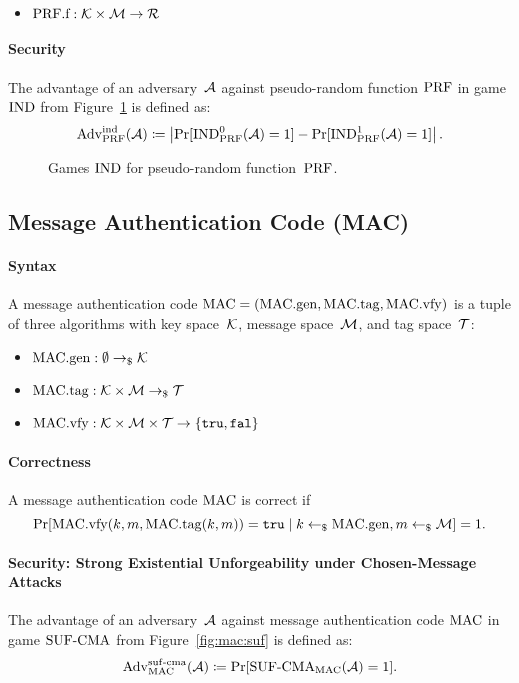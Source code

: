 \documentclass[a4paper,orivec]{llncs}
\begin{document}
\begin{itemize}
    \item $\mathrm{PRF}.\mathrm{f}: \mathcal{K}\times\mathcal{M} \to \mathcal{R}$
\end{itemize}

\paragraph{Security}
The advantage of an adversary~$\mathcal{A}$ against pseudo-random function $\mathrm{PRF}$ in game ${\mathrm{IND}}$ from Figure~\ref{fig:prf:ind} is defined as:
\[
\mathrm{Adv}_{\mathrm{PRF}}^{\mathrm{ind}}(\mathcal{A})\coloneqq\left|\Pr[{\mathrm{IND}}_{\mathrm{PRF}}^0(\mathcal{A})=1]-\Pr[{\mathrm{IND}}_{\mathrm{PRF}}^1(\mathcal{A})=1]\right|\text{.}
\]

\begin{figure}[!ht]
    \centering
    \nicoresetlinenr%
    \fbox{%
        \scalebox{\codescalefactor}{%
        }%
    }
    \caption{%
        Games ${\mathrm{IND}}$ for pseudo-random function~$\mathrm{PRF}$.
    }
    \label{fig:prf:ind}
\end{figure}

\subsection{Message Authentication Code (MAC)}

\paragraph{Syntax}
A message authentication code $\mathrm{MAC}=(\mathrm{MAC}.\mathrm{gen},\mathrm{MAC}.\mathrm{tag},\mathrm{MAC}.\mathrm{vfy})$ is a tuple of three algorithms with key space~$\mathcal{K}$, message space~$\mathcal{M}$, and tag space~$\mathcal{T}$:

\begin{itemize}
    \item $\mathrm{MAC}.\mathrm{gen}: \emptyset \to_\$ \mathcal{K}$
    \item $\mathrm{MAC}.\mathrm{tag}: \mathcal{K}\times\mathcal{M} \to_\$ \mathcal{T}$
    \item $\mathrm{MAC}.\mathrm{vfy}: \mathcal{K}\times\mathcal{M}\times\mathcal{T} \to \{\mathtt{tru},\mathtt{fal}\}$
\end{itemize}

\paragraph{Correctness}
A message authentication code $\mathrm{MAC}$ is correct if
\[
\Pr[\mathrm{MAC}.\mathrm{vfy}(k,m,\mathrm{MAC}.\mathrm{tag}(k,m))=\mathtt{tru}\mid k\gets_\$\mathrm{MAC}.\mathrm{gen},m\gets_\$\mathcal{M}]=1\text{.}
\]

\paragraph{Security: Strong Existential Unforgeability under Chosen-Message Attacks}
The advantage of an adversary~$\mathcal{A}$ against message authentication code $\mathrm{MAC}$ in game ${\mathrm{SUF}\text{-}\mathrm{CMA}}$ from Figure~\ref{fig:mac:suf} is defined as:
\[
\mathrm{Adv}_{\mathrm{MAC}}^{\mathrm{suf}\text{-}\mathrm{cma}}(\mathcal{A})\coloneqq\Pr[{\mathrm{SUF}\text{-}\mathrm{CMA}}_{\mathrm{MAC}}(\mathcal{A})=1]\text{.}
\]
\end{document}
